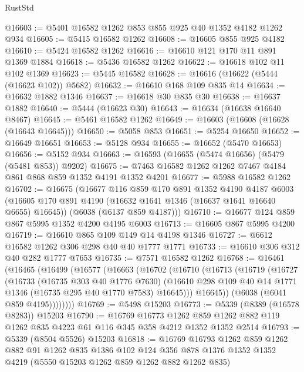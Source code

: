 \begin{lexlean}{RustStd}
\begin{coremodule}
@16603 := @5401 @16582 @1262 @853 @855 @925 @40 @1352 @4182 @1262 @934
@16605 := @5415 @16582 @1262
@16608 := @16605 @855 @925 @4182
@16610 := @5424 @16582 @1262
@16616 := @16610 @121 @170 @11 @891 @1369 @1884
@16618 := @5436 @16582 @1262
@16622 := @16618 @102 @11 @102 @1369
@16623 := @5445 @16582
@16628 := @16616 (@16622 (@5444 (@16623 @102)) @5682)
@16632 := @16610 @168 @109 @835 @14
@16634 := @16632 @1882 @1346
@16637 := @16618 @30 @835 @30
@16638 := @16637 @1882
@16640 := @5444 (@16623 @30)
@16643 := @16634 (@16638 @16640 @8467)
@16645 := @5461 @16582 @1262
@16649 := @16603 (@16608 (@16628 (@16643 @16645)))
@16650 := @5058 @853
@16651 := @5254 @16650
@16652 := @16649 @16651
@16653 := @5128 @934
@16655 := @16652 (@5470 @16653)
@16656 := @5152 @934
@16663 := @16593 (@16655 (@5474 @16656) (@5479 (@5481 @853)) @9202)
@16675 := @7463 @16582 @1262 @1262 @7467 @4184 @861 @868 @859 @1352 @4191 @1352 @4201
@16677 := @5988 @16582 @1262
@16702 := @16675
    (@16677
      @116
      @859
      @170
      @891
      @1352
      @4190
      @4187
      @6003
      (@16605 @170 @891 @4190 (@16632 @1641 @1346 (@16637 @1641 @16640 @6655) @16645))
      (@6038 (@6137 @859 @4187)))
@16710 := @16677 @124 @859 @867 @5995 @1352 @4200 @4195 @6003
@16713 := @16605 @867 @5995 @4200
@16719 := @16610 @865 @109 @149 @14 @4198 @1346
@16727 := @6612 @16582 @1262 @306 @298 @40 @40 @1777 @1771
@16733 := @16610 @306 @312 @40 @282 @1777 @7653
@16735 := @7571 @16582 @1262
@16768 := @16461
    (@16465
      (@16499
        (@16577
          (@16663
            (@16702
              (@16710
                (@16713
                  (@16719
                    (@16727
                      (@16733
                        (@16735 @303 @40 @1776 @7630)
                        (@16610
                          @298
                          @109
                          @40
                          @14
                          @1771
                          @1346
                          (@16735 @295 @40 @1770 @7583)
                          @16645)))
                    @16645))
                (@6038 (@6041 @859 @4195))))))))
@16769 := @5498 @15203
@16773 := @5339 (@8389 (@16578 @8283)) @15203
@16790 := @16769
    @16773
    @1262
    @859
    @1262
    @882
    @119
    @1262
    @835
    @4223
    @61
    @116
    @345
    @358
    @4212
    @1352
    @1352
    @2514
@16793 := @5339 (@8504 @5526) @15203
@16818 := @16769
    @16793
    @1262
    @859
    @1262
    @882
    @91
    @1262
    @835
    @1386
    @102
    @124
    @356
    @878
    @1376
    @1352
    @1352
    @4219
    (@5550 @15203 @1262 @859 @1262 @882 @1262 @835)

\end{coremodule}
\end{lexlean}
